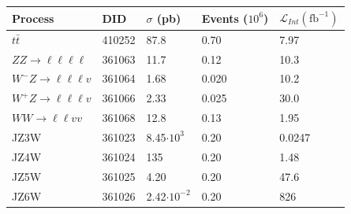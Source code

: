 \begin{table}[!htb]
  \centering
  \begin{tabular}{ l l l l l}
    \hline
    \hline
    Process         &   DID     &   $\sigma$ (pb)       & Events ($10^{6}$) &   $\mathcal{L}_{Int} (\mathrm{fb^{-1}})$ \\
    \hline
    $t\bar{t}$                              &   410252  &   87.8   &   0.70        &   7.97                 \\
    $ZZ\rightarrow \ell \ell \ell \ell$     &   361063  &   11.7   &   0.12        &   10.3                 \\
    $W^{-}Z\rightarrow \ell \ell \ell v$    &   361064  &   1.68   &   0.020       &   10.2                 \\
    $W^{+}Z\rightarrow \ell \ell \ell v$    &   361066  &   2.33   &   0.025       &   30.0                 \\
    $WW \rightarrow \ell \ell vv$           &   361068  &   12.8   &   0.13        &   1.95                 \\
    JZ3W                                    &   361023  &   8.45$\cdot10^{3}$      &   0.20  &   0.0247     \\
    JZ4W                                    &   361024  &   135    &   0.20        &   1.48                 \\
    JZ5W                                    &   361025  &   4.20   &   0.20        &   47.6                 \\
    JZ6W                                    &   361026  &   2.42$\cdot10^{-2}$     &   0.20  &   826        \\

\end{tabular}
\end{table}
